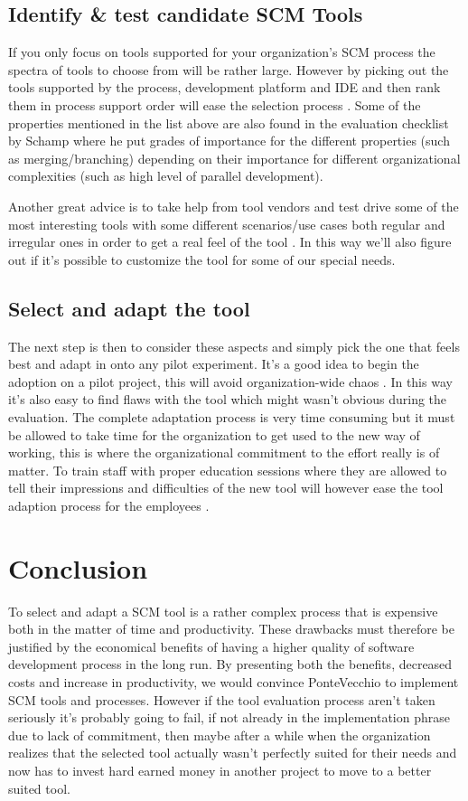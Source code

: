 \documentclass[10pt]{article}
\begin{document}
\subsection{Identify \& test candidate SCM Tools}
If you only focus on tools supported for your organization's SCM process the spectra of tools to choose from will be rather large. However by picking out the tools supported by the process, development platform and IDE and then rank them in process support order will ease the selection process \cite{Sayko}.
Some of the properties mentioned in the list above are also found in the evaluation checklist by Schamp \cite{Schamp} where he put grades of importance for the different properties (such as merging/branching) depending on their importance for different organizational complexities (such as high level of parallel development).

\noindent Another great advice is to take help from tool vendors and test drive some of the most interesting tools with some different scenarios/use cases both regular and irregular ones in order to get a real feel of the tool \cite{Sayko}. In this way we'll also figure out if it's possible to customize the tool for some of our special needs.

\subsection{Select and adapt the tool}
 The next step is then to consider these aspects and simply pick the one that feels best and adapt in onto any pilot experiment. It's a good idea to begin the adoption on a pilot project, this will avoid organization-wide chaos \cite{Sayko}. In this way it's also easy to find flaws with the tool which might wasn't obvious during the evaluation. 
The complete adaptation process is very time consuming but it must be allowed to take time for the organization to get used to the new way of working, this is where the organizational commitment to the effort really is of matter. To train staff with proper education sessions where they are allowed to tell their impressions and difficulties of the new tool will however ease the tool adaption process for the employees \cite{Sayko}.

\section{Conclusion}

\noindent To select and adapt a SCM tool is a rather complex process that is expensive both in the matter of time and productivity. These drawbacks must therefore be justified by the economical benefits of having a higher quality of software development process in the long run. By presenting both the benefits, decreased costs and increase in productivity, we would convince PonteVecchio to implement SCM tools and processes. However if the tool evaluation process aren't taken seriously it's probably going to fail, if not already in the implementation phrase due to lack of commitment, then maybe after a while when the organization realizes that the selected tool actually wasn't perfectly suited for their needs and now has to invest hard earned money in another project to move to a better suited tool.
\end{document}
